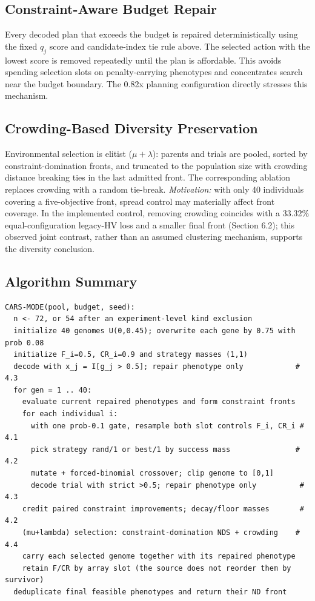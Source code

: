 \documentclass[energies,article,submit,moreauthors]{Definitions/mdpi}
\begin{document}
\subsection{Constraint-Aware Budget Repair}\label{constraint-aware-budget-repair}

Every decoded plan that exceeds the budget is repaired deterministically using the fixed \(q_j\) score and candidate-index tie rule above. The selected action with the lowest score is removed repeatedly until the plan is affordable. This avoids spending selection slots on penalty-carrying phenotypes and concentrates search near the budget boundary. The 0.82x planning configuration directly stresses this mechanism.

\subsection{Crowding-Based Diversity Preservation}\label{crowding-based-diversity-preservation}

Environmental selection is elitist (\(\mu + \lambda\)): parents and trials are pooled, sorted by constraint-domination fronts, and truncated to the population size with crowding distance \cite{ref27} breaking ties in the last admitted front. The corresponding ablation replaces crowding with a random tie-break. \emph{Motivation:} with only 40 individuals covering a five-objective front, spread control may materially affect front coverage. In the implemented control, removing crowding coincides with a 33.32\% equal-configuration legacy-HV loss and a smaller final front (Section 6.2); this observed joint contrast, rather than an assumed clustering mechanism, supports the diversity conclusion.

\subsection{Algorithm Summary}\label{algorithm-summary}

\begin{verbatim}
CARS-MODE(pool, budget, seed):
  n <- 72, or 54 after an experiment-level kind exclusion
  initialize 40 genomes U(0,0.45); overwrite each gene by 0.75 with prob 0.08
  initialize F_i=0.5, CR_i=0.9 and strategy masses (1,1)
  decode with x_j = I[g_j > 0.5]; repair phenotype only            # 4.3
  for gen = 1 .. 40:
    evaluate current repaired phenotypes and form constraint fronts
    for each individual i:
      with one prob-0.1 gate, resample both slot controls F_i, CR_i # 4.1
      pick strategy rand/1 or best/1 by success mass               # 4.2
      mutate + forced-binomial crossover; clip genome to [0,1]
      decode trial with strict >0.5; repair phenotype only          # 4.3
    credit paired constraint improvements; decay/floor masses       # 4.2
    (mu+lambda) selection: constraint-domination NDS + crowding    # 4.4
    carry each selected genome together with its repaired phenotype
    retain F/CR by array slot (the source does not reorder them by survivor)
  deduplicate final feasible phenotypes and return their ND front
\end{verbatim}
\end{document}
